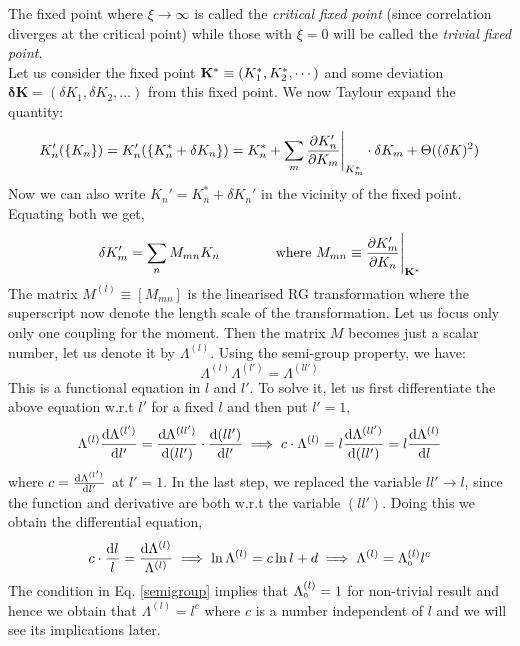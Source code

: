 The fixed point where $\xi\to \infty$ is called the \textit{critical fixed point} (since correlation diverges at the critical point) while those with $\xi=0$ will be called the \textit{trivial fixed point}.\\[0.2cm]
Let us consider the fixed point $\vb{K}^* \equiv (K_1^*, K_2^*,\cdots )$ and some deviation $\boldsymbol{\delta K}=(\delta K_1, \delta K_2,\ldots)$ from this fixed point. We now Taylour expand the quantity:
$$K_n'(\{K_n\}) = K_n'(\{K_n^*+\delta K_n\}) = K_n^* +\sum\limits_m \pdv{K'_n}{K_m}\Bigg|_{K_m^*} \cdot \delta K_m + \Theta((\delta K)^2)$$
Now we can also write $K_n' = K^*_n  + \delta K_n'$ in the vicinity of the fixed point. Equating both we get,
\begin{align}\label{RGlinear}
    \delta K_m' = \sum\limits_{n} M_{mn} K_n \qquad \qquad \text{where } M_{mn} \equiv \pdv{K'_m}{K_n}\Bigg|_{\vb{K}^*} 
\end{align}
The matrix $M^{(l)} \equiv [M_{mn}]$ is the linearised RG transformation where the superscript now denote the length scale of the transformation. Let us focus only only one coupling for the moment. Then the matrix $M$ becomes just a scalar number, let us denote it by $\Lambda^{(l)}$. Using the semi-group property, we have:
\begin{equation}\label{semigroup}
    \Lambda^{(l)} \Lambda^{(l')} = \Lambda^{(ll')}
\end{equation}
This is a functional equation in $l$ and $l'$. To solve it, let us first differentiate the above equation w.r.t $l'$ for a fixed $l$ and then put $l'=1$,
$$\Lambda^{(l)}\dv{ \Lambda^{(l')}}{l'} = \dv{\Lambda^{(ll')}}{(ll')}\cdot \dv{(ll')}{l'} \implies c\cdot \Lambda^{(l)} =l \dv{\Lambda^{(ll')}}{(ll')} =l \dv{\Lambda^{(l)}}{l} $$
where $c=\dv{ \Lambda^{(l')}}{l'}$ at $l'=1$. In the last step, we replaced the variable $ll' \to l$, since the function and derivative are both w.r.t the variable $(ll')$.  Doing this we obtain the differential equation,
$$c\cdot \frac{\dd l}{l}  =  \frac{\dd \Lambda^{(l)}}{\Lambda^{(l)}} \implies  \ln \Lambda^{(l)}=c\ln l +d \implies \Lambda^{(l)} = \Lambda^{(l)}_{\text{\tiny 0}}l^c$$
The condition in Eq. \eqref{semigroup} implies that $\Lambda^{(l)}_{\text{\tiny 0}}=1$ for non-trivial result and hence we obtain that $\Lambda^{(l)} = l^c$ where $c$ is a number independent of $l$ and we will see its implications later.